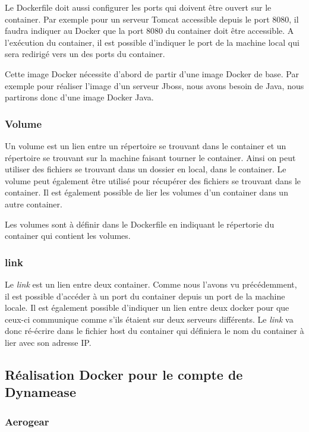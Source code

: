 Le Dockerfile doit aussi configurer les ports qui doivent être ouvert sur le container. Par exemple pour un serveur Tomcat accessible depuis le port 8080, il faudra indiquer au Docker que la port 8080 du container doit être accessible. A l'exécution du container, il est possible d'indiquer le port de la machine local qui sera redirigé vers un des ports du container. 

Cette image Docker nécessite d'abord de partir d'une image Docker de base. Par exemple pour réaliser l'image d'un serveur Jboss, nous avons besoin de Java, nous partirons donc d'une image Docker Java.


\subsubsection{Volume}

Un volume est un lien entre un répertoire se trouvant dans le container et un répertoire se trouvant sur la machine faisant tourner le container. Ainsi on peut utiliser des fichiers se trouvant dans un dossier en local, dans le container. Le volume peut également être utilisé pour récupérer des fichiers se trouvant dans le container. Il est également possible de lier les volumes d'un container dans un autre container.

Les volumes sont à définir dans le Dockerfile en indiquant le répertorie du container qui contient les volumes.

\subsubsection{link}

Le \textit{link} est un lien entre deux container. Comme nous l'avons vu précédemment, il est possible d'accéder à un port du container depuis un port de la machine locale. Il est également possible d'indiquer un lien entre deux docker pour que ceux-ci communique comme s'ils étaient sur deux serveurs différents. Le \textit{link} va donc ré-écrire dans le fichier host du container qui définiera le nom du container à lier avec son adresse IP.

\subsection{Réalisation Docker pour le compte de Dynamease}

\subsubsection{Aerogear}

